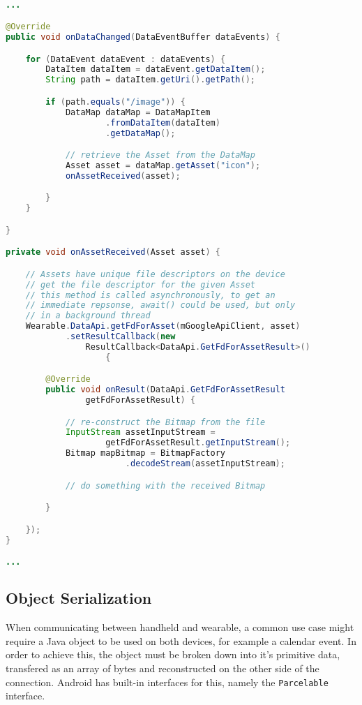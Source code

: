 \begin{lstlisting}[language=Java]

...

@Override
public void onDataChanged(DataEventBuffer dataEvents) {

    for (DataEvent dataEvent : dataEvents) {
        DataItem dataItem = dataEvent.getDataItem();
        String path = dataItem.getUri().getPath();

        if (path.equals("/image")) {
            DataMap dataMap = DataMapItem
                    .fromDataItem(dataItem)
                    .getDataMap();

            // retrieve the Asset from the DataMap
            Asset asset = dataMap.getAsset("icon");
            onAssetReceived(asset);

        }
    }

}

private void onAssetReceived(Asset asset) {

    // Assets have unique file descriptors on the device
    // get the file descriptor for the given Asset
    // this method is called asynchronously, to get an
    // immediate repsonse, await() could be used, but only
    // in a background thread
    Wearable.DataApi.getFdForAsset(mGoogleApiClient, asset)
            .setResultCallback(new
                ResultCallback<DataApi.GetFdForAssetResult>()
                    {

        @Override
        public void onResult(DataApi.GetFdForAssetResult
                getFdForAssetResult) {

            // re-construct the Bitmap from the file
            InputStream assetInputStream =
                    getFdForAssetResult.getInputStream();
            Bitmap mapBitmap = BitmapFactory
                        .decodeStream(assetInputStream);

            // do something with the received Bitmap

        }

    });
}

...

\end{lstlisting}



\subsection{Object Serialization}

When communicating between handheld and wearable, a common use case might
require a Java object to be used on both devices, for example a calendar event.
In order to achieve this, the object must be broken down into it's primitive
data, transfered as an array of bytes and reconstructed on the other side of
the connection. Android has built-in interfaces for this, namely the
\texttt{Parcelable} interface.

